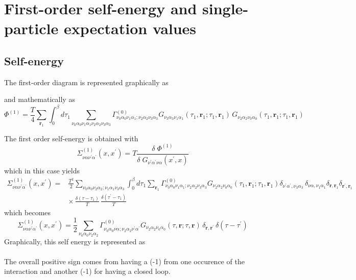 \chapter{First-order self-energy and single-particle expectation values}
\label{first-order}

\section{Self-energy}
\label{first-order-self-energy}
The first-order diagram is
represented graphically as 
\begin{center}
\end{center}
and mathematically as
\begin{equation}
\Phi^{(1)} = \frac{T}{4} \sum_{\mathbf{r}_1} \int_0^{\beta}d\tau_1
\sum_{\nu_0\alpha_0\nu_1 \alpha_1\nu_2\alpha_2 \nu_3 \alpha_3} 
\Gamma^{(0)}_{\nu_0\alpha_0\nu_1\alpha_1; \nu_2\alpha_2 \nu_3\alpha_3}
G_{\nu_3\alpha_3\nu_1\alpha_1}(\tau_1,\mathbf{r}_1;\tau_1,\mathbf{r}_1)
\,G_{\nu_2\alpha_2\nu_0\alpha_0}(\tau_1,\mathbf{r}_1;\tau_1,\mathbf{r}_1) 
\end{equation}

The first order self-energy is obtained with
\begin{equation}
\Sigma^{(1)}_{\nu\alpha \nu^{\prime}\alpha^{\prime}}(x,x^{\prime})  =
T \frac{\delta\; \Phi^{(1)}}
{\delta\; G_{\nu^{\prime}\alpha^{\prime}\nu \alpha}(x^{\prime},x)} 
\end{equation}
which in this case yields
\begin{equation}
\begin{split}
\Sigma^{(1)}_{\nu\alpha \nu^{\prime}\alpha^{\prime}}(x,x^{\prime})
= & \frac{T^2}{2} \sum_{\nu_0\alpha_0 \nu_2\alpha_2;\nu_1 \alpha_1 \nu_3\alpha_3}
\int_{0}^{\beta}d\tau_1 \sum_{\mathbf{r}_1}
\Gamma^{(0)}_{\nu_0\alpha_0 \nu_1\alpha_1; \nu_2\alpha_2 \nu_3 \alpha_3}
G_{\nu_2\alpha_2\nu_0 \alpha_0}(\tau_1,\mathbf{r}_1;\tau_1,\mathbf{r}_1)
\delta_{\nu^{\prime}\alpha^{\prime},\nu_3\alpha_3}\,\delta_{\nu\alpha,\nu_1\alpha_1}
\delta_{\mathbf{r},\mathbf{r}_1} \delta_{\mathbf{r}^{\prime},\mathbf{r}_1} 
\\
& \times\,
\frac{\delta(\tau - \tau_1)}{T}\,\frac{\delta(\tau^{\prime} - \tau_1)}{T}
\end{split}
\end{equation}
which becomes
\begin{equation}
\Sigma^{(1)}_{\nu\alpha \nu^{\prime}\alpha^{\prime}}(x,x^{\prime}) =
\frac{1}{2}\sum_{\nu_0\alpha_0 \nu_2\alpha_2}
\Gamma^{(0)}_{\nu_0\alpha_0\nu\alpha; \nu_2\alpha_2 \nu^{\prime}\alpha^{\prime}}
G_{\nu_2\alpha_2 \nu_0\alpha_0}(\tau,\mathbf{r};\tau,\mathbf{r})\,
\delta_{\mathbf{r},\mathbf{r}^{\prime}} \, \delta(\tau - \tau^{\prime})
\end{equation}
Graphically, this self energy is represented as\\
\\
The overall positive sign comes from having a (-1) from one
occurence of the interaction and another (-1) for having
a closed loop.

